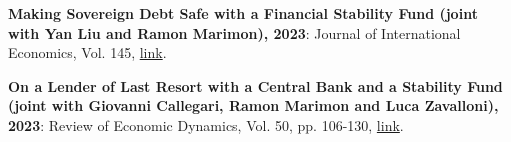 \documentclass[letterpaper,11pt]{article}
\newcommand{\resumeItem}[2]{
  \item\small{
    \textbf{#1}{: #2 \vspace{-2pt}}
  }
}
\newcommand{\resumeSubItem}[2]{\resumeItem{#1}{#2}\vspace{-1pt}}
\begin{document}
\resumeSubItem{Making Sovereign Debt Safe with a Financial Stability Fund (joint with Yan Liu and Ramon Marimon), 2023}{Journal of International Economics, Vol. 145, \href{https://www.sciencedirect.com/science/article/pii/S0022199623001204}{link}. } %
\resumeSubItem{On a Lender of Last Resort with a Central Bank and a Stability Fund (joint with Giovanni Callegari, Ramon Marimon and Luca Zavalloni), 2023}{ Review of Economic Dynamics, Vol. 50, pp. 106-130, \href{https://www.sciencedirect.com/science/article/pii/S1094202523000443?via\%3Dihub}{link}. }%
\end{document}

